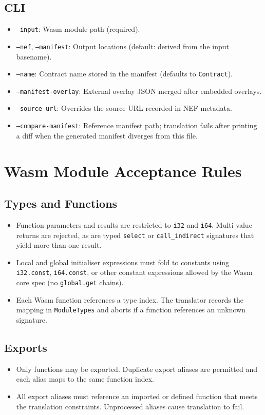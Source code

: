 \documentclass[11pt]{article}
\begin{document}
\subsection{CLI}
\begin{itemize}[nosep]
    \item \texttt{--input}: Wasm module path (required).
    \item \texttt{--nef}, \texttt{--manifest}: Output locations (default: derived from the input basename).
    \item \texttt{--name}: Contract name stored in the manifest (defaults to \texttt{Contract}).
    \item \texttt{--manifest-overlay}: External overlay JSON merged after embedded overlays.
    \item \texttt{--source-url}: Overrides the source URL recorded in NEF metadata.
    \item \texttt{--compare-manifest}: Reference manifest path; translation fails after printing a diff when the generated manifest diverges from this file.
\end{itemize}

\section{Wasm Module Acceptance Rules}
\subsection{Types and Functions}
\begin{itemize}[nosep]
    \item Function parameters and results are restricted to \texttt{i32} and \texttt{i64}. Multi-value returns are rejected, as are typed \texttt{select} or \texttt{call\_indirect} signatures that yield more than one result.
    \item Local and global initialiser expressions must fold to constants using \texttt{i32.const}, \texttt{i64.const}, or other constant expressions allowed by the Wasm core spec (no \texttt{global.get} chains).
    \item Each Wasm function references a type index. The translator records the mapping in \texttt{ModuleTypes} and aborts if a function references an unknown signature.
\end{itemize}

\subsection{Exports}
\begin{itemize}[nosep]
    \item Only functions may be exported. Duplicate export aliases are permitted and each alias maps to the same function index.
    \item All export aliases must reference an imported or defined function that meets the translation constraints. Unprocessed aliases cause translation to fail.
\end{itemize}
\end{document}
